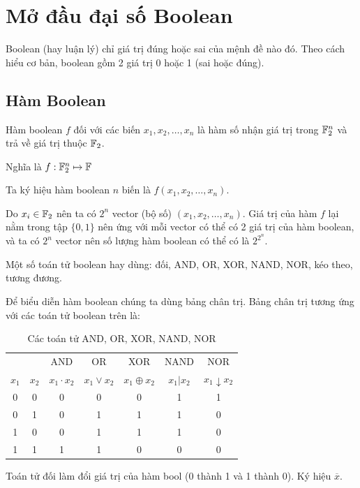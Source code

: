 \chapter{Mở đầu đại số Boolean}

Boolean (hay luận lý) chỉ giá trị đúng hoặc sai của mệnh đề nào đó. 
Theo cách hiểu cơ bản, boolean gồm 2 giá trị 0 hoặc 1 (sai hoặc đúng).

\section{Hàm Boolean}

Hàm boolean $f$ đối với các biến $x_1, x_2, \ldots, x_n$ là hàm số 
nhận giá trị trong $\mathbb{F}_2^n$ và trả về giá trị thuộc $\mathbb{F}_2$.

Nghĩa là $f: \mathbb{F}_2^n \mapsto \mathbb{F}$

Ta ký hiệu hàm boolean $n$ biến là $f(x_1, x_2, \ldots, x_n)$.

Do $x_i \in \mathbb{F}_2$ nên ta có $2^n$ vector (bộ số)
$(x_1, x_2, \ldots, x_n)$. Giá trị của hàm $f$ lại nằm
trong tập $\{0, 1\}$ nên ứng với mỗi vector có thể có 2 giá 
trị của hàm boolean, và ta có $2^n$ vector nên số lượng hàm
boolean có thể có là $2^{2^n}$.

Một số toán tử boolean hay dùng: đối, AND, OR, XOR, NAND, NOR, 
kéo theo, tương đương.

Để biểu diễn hàm boolean chúng ta dùng bảng chân trị. Bảng chân
trị tương ứng với các toán tử boolean trên là:

\begin{table}[ht]
    \centering
    \begin{tabular}{|c|c|c|c|c|c|c|}
        \hline
        & & AND & OR & XOR & NAND & NOR \\
        $x_1$ & $x_2$ & $x_1 \cdot x_2$ & $x_1 \vee x_2$ &
            $x_1 \oplus x_2$ & $x_1 \vert x_2$ &
            $x_1 \downarrow x_2$ \\
        \hline
        0 & 0 & 0 & 0 & 0 & 1 & 1 \\
        \hline
        0 & 1 & 0 & 1 & 1 & 1 & 0 \\
        \hline
        1 & 0 & 0 & 1 & 1 & 1 & 0 \\
        \hline
        1 & 1 & 1 & 1 & 0 & 0 & 0 \\
        \hline
    \end{tabular}
    \caption{Các toán tử AND, OR, XOR, NAND, NOR}
\end{table}

Toán tử đối làm đổi giá trị của hàm bool (0 thành 1 và 1 thành 0).
Ký hiệu $\overline{x}$.

